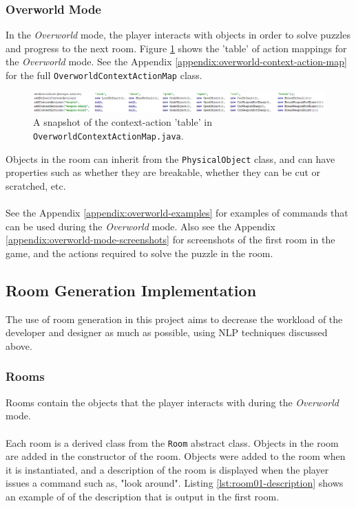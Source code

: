 \documentclass[11pt]{article}
\begin{document}
\subsubsection{Overworld Mode}

In the \textit{Overworld} mode, the player interacts with objects in order to solve puzzles and progress to the next room. Figure \ref{fig:overworld-context-action-map} shows the 'table' of action mappings for the \textit{Overworld} mode. See the Appendix \ref{appendix:overworld-context-action-map} for the full \texttt{OverworldContextActionMap} class.

\begin{center}
\begin{figure}[H]
\begin{center}
  \includegraphics[width=\linewidth]{overworld-context-action-map.png}
  \caption{A snapshot of the context-action 'table' in \texttt{OverworldContextActionMap.java}.}
  \label{fig:overworld-context-action-map}
  \end{center}
\end{figure}
\end{center}

Objects in the room can inherit from the \texttt{PhysicalObject} class, and can have properties such as whether they are breakable, whether they can be cut or scratched, etc.
\\
\\
See the Appendix \ref{appendix:overworld-examples} for examples of commands that can be used during the \textit{Overworld} mode. Also see the Appendix \ref{appendix:overworld-mode-screenshots} for screenshots of the first room in the game, and the actions required to solve the puzzle in the room.

\subsection{Room Generation Implementation}
\label{section:room-generation}

The use of room generation in this project aims to decrease the workload of the developer and designer as much as possible, using NLP techniques discussed above.

\subsubsection{Rooms}
Rooms contain the objects that the player interacts with during the \textit{Overworld} mode.
\\
\\
Each room is a derived class from the \texttt{Room} abstract class. Objects in the room are added in the constructor of the room. Objects were added to the room when it is instantiated, and a description of the room is displayed when the player issues a command such as, "look around". Listing \ref{lst:room01-description} shows an example of of the description that is output in the first room.
\end{document}

